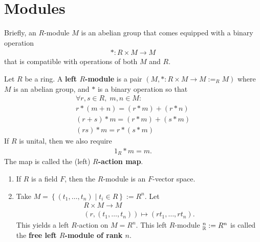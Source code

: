 \documentclass{memoir}
\begin{document}


\section{Modules}
\label{sec:modules}

Briefly, an \(R\)-module \(M\) is an abelian group that comes equipped with a binary operation
\begin{align*}
	* : R\times M \to M
\end{align*}
that is compatible with operations of both \(M\) and \(R\).

\begin{defn}
	Let \(R\) be a ring. A \textbf{left \(R\)-module} is a pair \((M,*:R\times M\to M := _RM)\) where \(M\) is an abelian group, and \(*\) is a binary operation so that
	\begin{align*}
		\forall r,s \in R, \; m,n \in M:\\
		r*(m+n) = (r*m) + (r*n)\\
		(r+s)*m = (r*m) + (s*m)\\
		(rs)*m = r*(s*m)
	\end{align*}
	If \(R\) is unital, then we also require
	\begin{align*}
		1_R * m = m.
	\end{align*}
	The map is called the (left) \textbf{\(R\)-action map}.
\end{defn}

\begin{exmp}
	\begin{enumerate}
		\item If \(R\) is a field \(F\), then the \(R\)-module is an \(F\)-vector space.
		\item Take \(M = \left\{(t_1,\ldots,t_n) \mid t_i \in R \right\}:= R^{n}\). Let
			\begin{align*}
				R\times M \to M\\
				(r,(t_1,\ldots,t_n)) \mapsto (rt_1,\ldots,rt_n).
			\end{align*}
			This yields a left \(R\)-action on \(M = R^{n}\). This left \(R\)-module \(_{\mathbb{R}}^{n}:= R^{n}\) is called the \textbf{free left \(R\)-module of rank \(n\)}.
	\end{enumerate}
\end{exmp}
\end{document}
